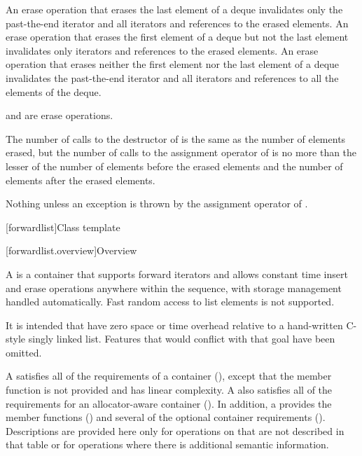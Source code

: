 \begin{itemdescr}
\pnum
\effects
An erase operation that erases the last element of a deque invalidates only the past-the-end iterator
and all iterators and references to the erased elements. An erase operation that erases the first
element of a deque but not the last element invalidates only iterators
and references to the erased elements. An erase operation
that erases neither the first element nor the last element of a deque invalidates the past-the-end
iterator and all iterators and references to all the elements of the deque.
\begin{note}  and  are erase operations. \end{note}

\pnum
\complexity
The number of calls to the destructor of  is the same as the
number of elements erased, but the number of calls to the assignment operator of  is
no more than the lesser of the number of elements before the erased elements and the number of elements after the erased elements.

\pnum
\throws
Nothing unless an exception is thrown by the assignment operator of
.
\end{itemdescr}

[forwardlist]{Class template }

[forwardlist.overview]{Overview}

\pnum
A  is a container that supports forward iterators and allows
constant time insert and erase operations anywhere within the sequence, with storage
management handled automatically. Fast random access to list elements is not supported.
\begin{note} It is intended that  have zero space or time overhead
relative to a hand-written C-style singly linked list. Features that would conflict with
that goal have been omitted.\end{note}

\pnum
A  satisfies all of the requirements of a container
(), except that the 
member function is not provided and  has linear complexity.
A  also satisfies all of the requirements for an allocator-aware
container (). In addition, a 
provides the  member functions
() and several of the optional
container requirements ().
Descriptions are provided here only for operations on
 that are not described in that table or for operations where there
is additional semantic information.

